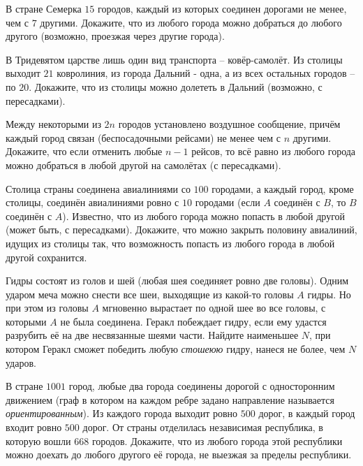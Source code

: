 \begin{problems}

\item В стране Семерка $15$ городов, каждый из которых соединен дорогами не менее, чем с $7$ другими. Докажите, что из любого города можно добраться до любого другого (возможно, проезжая через другие города).

\item В Тридевятом царстве лишь один вид транспорта -- ковёр-самолёт. Из столицы выходит $21$ ковролиния, из города Дальний - одна, а из всех остальных городов -- по $20$. Докажите, что из столицы можно долететь в Дальний (возможно, с пересадками).

\item Между некоторыми из $2n$ городов установлено воздушное сообщение, причём каждый город связан (беспосадочными рейсами) не менее чем с $n$ другими. Докажите, что если отменить любые $n-1$ рейсов, то всё равно из любого города можно добраться в любой другой на самолётах (с пересадками).

\item Столица страны соединена авиалиниями со $100$ городами, а каждый город, кроме столицы, соединён авиалиниями ровно с $10$ городами (если $A$ соединён с $B$, то $B$ соединён с $A$). Известно, что из любого города можно попасть в любой другой (может быть, с пересадками). Докажите, что можно закрыть половину авиалиний, идущих из столицы так, что возможность попасть из любого города в любой другой сохранится.

\item Гидры состоят из голов и шей (любая шея соединяет ровно две головы). Одним ударом меча можно снести все шеи, выходящие из какой-то головы $A$ гидры. Но при этом из головы $A$ мгновенно вырастает по одной шее во все головы, с которыми $A$ не была соединена. Геракл побеждает гидру, если ему удастся разрубить её на
две несвязанные шеями части. Найдите наименьшее $N$, при котором Геракл сможет победить любую  \textit{стошеюю} гидру, нанеся не более, чем $N$ ударов.

\item В стране $1001$ город, любые два города соединены дорогой с односторонним движением (граф в котором на каждом ребре задано направление называется \textit{ориентированным}). Из каждого города выходит ровно $500$ дорог, в каждый город входит ровно $500$ дорог. От страны отделилась независимая республика, в которую вошли $668$ городов. Докажите, что из любого города этой республики можно доехать до любого другого её города, не выезжая за пределы республики.

\end{problems}


